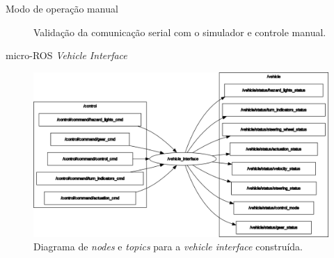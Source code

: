 \documentclass{if-beamer}
\begin{document}
\begin{frame}{Modo de operação manual}
	
	\begin{figure}[H]
		\centering
		\caption{Validação da comunicação serial com o simulador e controle manual.}
		\label{fig:controle_manual}
	\end{figure}
	
	
\end{frame}


\begin{frame}{micro-ROS \textit{Vehicle Interface}}

	\begin{figure}[H]
		\centering
		\includegraphics[width=0.85\linewidth]{rosgraph}
		\caption{Diagrama de \textit{nodes} e \textit{topics} para a \textit{vehicle interface} construída.}
		\label{fig:rosgraph}
	\end{figure}

\end{frame}
\end{document}
